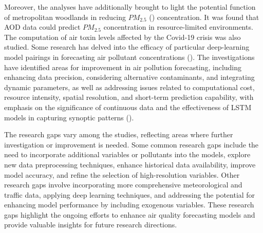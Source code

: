 \documentclass[a4paper, fleqn]{cas-sc}
\theoremstyle{definition}
\theoremstyle{remark}
\begin{document}
Moreover,  the analyses have additionally brought to light the potential function of metropolitan woodlands in reducing $PM_{2.5}$ (\cite{kumar2022deep}) concentration. It was found that AOD data could predict $PM_{2.5}$ concentration in resource-limited environments. The computation of air toxin levels affected by the Covid-19 crisis was also studied. Some research has delved into the efficacy of particular deep-learning model pairings in forecasting air pollutant concentrations (\cite{du2019deep}). The investigations have identified areas for improvement in air pollution forecasting,  including enhancing data precision,  considering alternative contaminants,  and integrating dynamic parameters,  as well as addressing issues related to computational cost,  resource intensity,  spatial resolution,  and short-term prediction capability,  with emphasis on the significance of continuous data and the effectiveness of LSTM models in capturing synoptic patterns (\cite{ZHANG2022134890}).

The research gaps vary among the studies, reflecting areas where further investigation or improvement is needed. Some common research gaps include the need to incorporate additional variables or pollutants into the models, explore new data preprocessing techniques, enhance historical data availability, improve model accuracy, and refine the selection of high-resolution variables. Other research gaps involve incorporating more comprehensive meteorological and traffic data, applying deep learning techniques, and addressing the potential for enhancing model performance by including exogenous variables. These research gaps highlight the ongoing efforts to enhance air quality forecasting models and provide valuable insights for future research directions.
\end{document}
